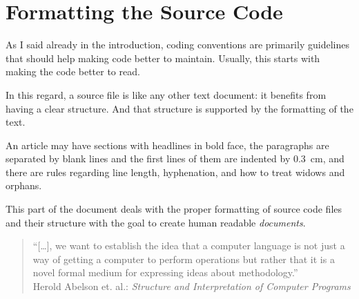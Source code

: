 \part{Formatting the Source Code}\label{sec:FormattingTheSourceCode}
As I said already in the introduction, coding conventions are primarily guidelines that should help making code better to maintain. Usually, this starts with making the code better to read.

In this regard, a source file is like any other text document: it benefits from having a clear structure. And that structure is supported by the formatting of the text.

An article may have sections with headlines in bold face, the paragraphs are separated by blank lines and the first lines of them are indented by 0.3~cm, and there are rules regarding line length, hyphenation, and how to treat widows and orphans.

This part of the document deals with the proper formatting of \Java source code files and their structure with the goal to create human readable \textit{documents}.

\begin{quote}
``[…], we want to establish the idea that a computer language is not just a way of getting a computer to perform operations but rather that it is a novel formal medium for expressing ideas
about methodology.'' \\
Herold Abelson et. al.: \textit{Structure and Interpretation of Computer Programs}
\autocite{Sussman:StructureAndInterpretationOfComputerPrograms}
\end{quote}

